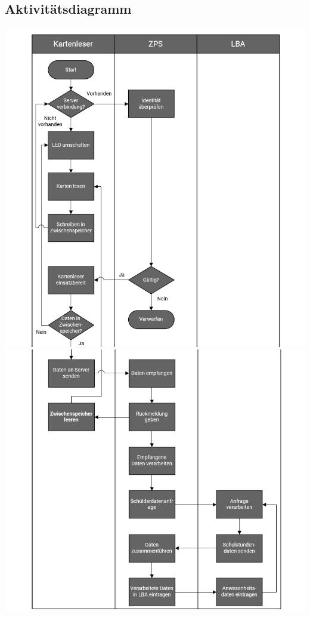 \subsection{Aktivitätsdiagramm}
\includegraphics[width=\textwidth]{images/visio1.png}
\newpage
\includegraphics[width=\textwidth]{images/visio2.png}

